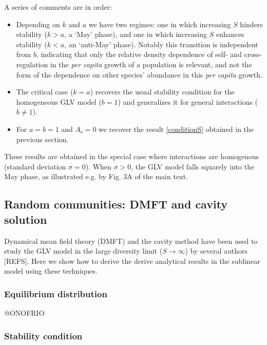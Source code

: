 \documentclass[12pt]{article}
\begin{document}
A series of comments are in order:
\begin{itemize}
    \item Depending on $k$ and $a$ we have two regimes: one in which increasing $S$ hinders stability ($k > a$, a `May' phase), and one in which increasing $S$ enhances stability ($k < a$, an `anti-May' phase). Notably this transition is independent from $b$, indicating that only the relative density dependence of self- and cross-regulation in the \emph{per capita} growth of a population is relevant, and not the form of the dependence on other species' abundance in this \emph{per capita} growth. 
    \item The critical case ($k=a$) recovers the usual stability condition for the homogeneous GLV model ($b=1$) and generalizes it for general interactions ($b\neq 1$).
    \item For $a = b = 1$ and  $ A_{\textrm{s}}=0$ we recover the result \eqref{conditionS} obtained in the previous section. 
\end{itemize}

These results are obtained in the special case where interactions are homogenous (standard deviation $\sigma = 0$). When $\sigma > 0$, the GLV model falls squarely into the May phase, as illustrated e.g. by Fig. 3A of the main text. 

\subsection{Random communities: DMFT and cavity solution}


Dynamical mean field theory (DMFT) and the cavity method have been used to study the GLV model in the large diversity limit ($S\to\infty$) by several authors [REFS]. Here we show how to derive the derive analytical results in the sublinear model using these techniques.

\subsubsection{Equilibrium distribution}\label{cavity}

@ONOFRIO

\subsubsection{Stability condition}
\end{document}
